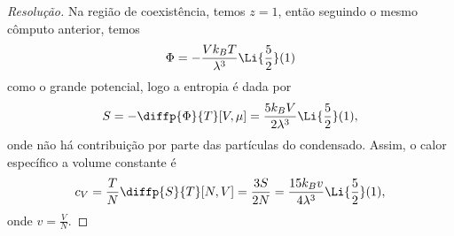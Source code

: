 \begin{proof}[Resolução]
    Na região de coexistência, temos \(z = 1\), então seguindo o mesmo cômputo anterior, temos
    \begin{equation*}
        \Phi = -\frac{Vk_B T}{\lambda^3}\Li{\frac52}(1)
    \end{equation*}
    como o grande potencial, logo a entropia é dada por
    \begin{equation*}
        S = - \diffp{\Phi}{T}[V, \mu] = \frac{5k_B V}{2 \lambda^3}\Li{\frac52}(1),
    \end{equation*}
    onde não há contribuição por parte das partículas do condensado. Assim, o calor específico a volume constante é
    \begin{equation*}
        c_V = \frac{T}{N} \diffp{S}{T}[N, V] = \frac{3S}{2N} = \frac{15 k_B v}{4 \lambda^3}\Li{\frac52}(1),
    \end{equation*}
    onde \(v = \frac{V}{N}\).
\end{proof}
